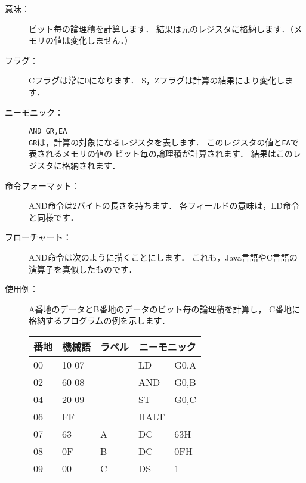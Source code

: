 \begin{description}
\item[意味：]ビット毎の論理積を計算します．
  結果は元のレジスタに格納します．（メモリの値は変化しません．）

\item[フラグ：]Cフラグは常に0になります．
  S，Zフラグは計算の結果により変化します．

\item[ニーモニック：]\texttt{AND  GR,EA} \\
  \texttt{GR}は，計算の対象になるレジスタを表します．
  このレジスタの値と\texttt{EA}で表されるメモリの値の
  ビット毎の論理積が計算されます．
  結果はこのレジスタに格納されます．

\item[命令フォーマット：]AND命令は2バイトの長さを持ちます．
  各フィールドの意味は，LD命令と同様です．


\item[フローチャート：]AND命令は次のように描くことにします．
  これも，Java言語やC言語の演算子を真似したものです．

  \begin{center}
  \end{center}

\item[使用例：]
  A番地のデータとB番地のデータのビット毎の論理積を計算し，
  C番地に格納するプログラムの例を示します．

  {\ttfamily\small\begin{center}
    \begin{tabular}{|l|l|l|l l|} \hline
      番地 & 機械語 & ラベル & \multicolumn{2}{|c|}{ニーモニック} \\
      \hline
      00 & 10 07 &   & LD   & G0,A \\
      02 & 60 08 &   & AND  & G0,B \\
      04 & 20 09 &   & ST   & G0,C \\
      06 & FF    &   & HALT &      \\
      07 & 63    & A & DC   & 63H  \\
      08 & 0F    & B & DC   & 0FH  \\
      09 & 00    & C & DS   & 1    \\
      \hline
    \end{tabular}
  \end{center}}


  \begin{center}
  \end{center}

\end{description}

